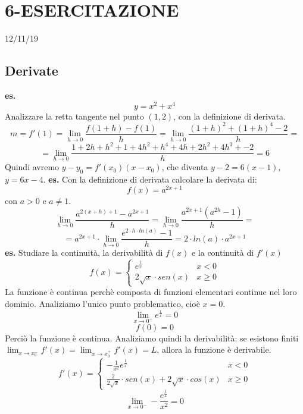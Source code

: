 \section*{6-ESERCITAZIONE}
12/11/19
\subsection*{Derivate}
\textbf{es.} 
\[
    y = x^2 +x^4
\]
Analizzare la retta tangente nel punto $(1,2)$, con la definizione di derivata.
\[
    m = f'(1) = \lim_{h\rightarrow 0} \frac{f(1+h)-f(1)}{h} = \lim_{h\rightarrow 0} \frac{(1+h)^2 + (1+h)^4 -2}{h} =
\]
\[
    = \lim_{h\rightarrow 0} \frac{1 + 2h+ h^2 + 1 + 4h^2 +h^4 +4h +2h^2 + 4h^3 +-2}{h} = 6
\]
Quindi avremo $y-y_0 = f'(x_0)(x-x_0)$, che diventa $y-2 = 6(x-1)$, $y = 6x-4$.\newline
\newline
\newline
\textbf{es.} Con la definizione di derivata calcolare la derivata di:
\[
    f(x) = a^{2x+1}
\]
con $a > 0$ e $a\neq 1$.
\[
    \lim_{h\rightarrow 0} \frac{a^{2(x+h)+1}-a^{2x+1}}{h} = \lim_{h\rightarrow 0} \frac{a^{2x+1}(a^{2h}-1)}{h}= 
\]
\[
    = a^{2x+1} \cdot  \lim_{h\rightarrow 0} \frac{e^{2 \cdot h \cdot ln(a) }-1}{h} = 2 \cdot ln(a) \cdot  a^{2x+1}
\]
\newline
\newline
\newline
\textbf{es.} Studiare la continuità, la derivabilità di $f(x)$ e la continuità di $f'(x)$
\[
    f(x)= \begin{cases}
        e^{\frac{1}{x}} & x<0 \\
        2 \sqrt{x} \cdot  sen(x) & x\geq 0
    \end{cases}
\]
La funzione è continua perchè composta di funzioni elementari continue nel loro dominio. Analiziamo l'unico punto problematico, cioè $x=0$.
\[
    \lim_{x\rightarrow 0^-} e ^{\frac{1}{x}} = 0 
\]
\[
    f(0) = 0
\]
Perciò la funzione è continua.\newline
Analiziamo quindi la derivabilità: se esistono finiti $\lim_{x\rightarrow x_0^-} f'(x) = \lim_{x\rightarrow x_0^+} f'(x) = L$, allora la funzione è derivabile.
\[
    f'(x) = \begin{cases}
        - \frac{1}{x^2} e ^{\frac{1}{x}} & x<0\\
        \frac{2}{2 \sqrt{x}} \cdot  sen(x) + 2 \sqrt{x} \cdot cos(x)& x \geq 0
    \end{cases}
\]
\[
    \lim_{x\rightarrow 0^-} - \frac{ e ^{\frac{1}{x}}}{x^2} = 0
\]
